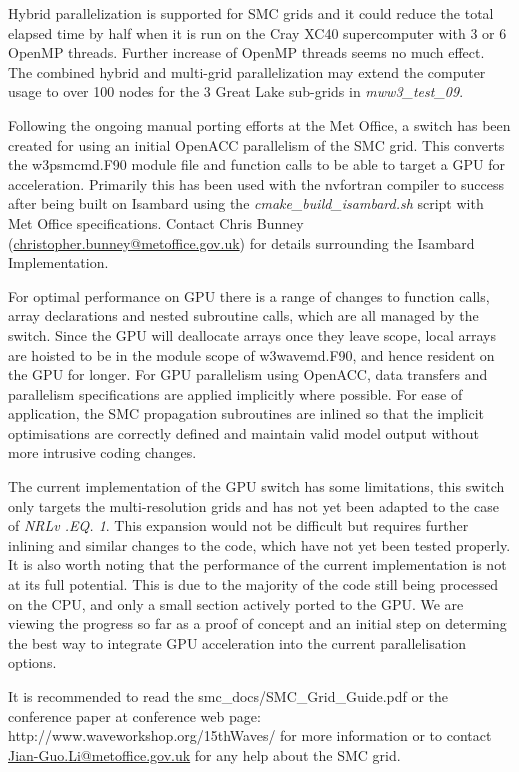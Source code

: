 Hybrid parallelization is supported for SMC grids and it could reduce the total
elapsed time by half when it is run on the Cray XC40 supercomputer with 3 or 6
OpenMP threads. Further increase of OpenMP threads seems no much effect.  The 
combined hybrid and multi-grid parallelization may extend the computer usage
to over 100 nodes for the 3 Great Lake sub-grids in \emph{mww3\_test\_09}.

Following the ongoing manual porting efforts at the Met Office, a switch has been 
created for using an initial OpenACC parallelism of the SMC grid. This converts the 
w3psmcmd.F90 module file and function calls to be able to target a GPU for 
acceleration. Primarily this has been used with the nvfortran compiler to success 
after being built on Isambard using the \emph{cmake\_build\_isambard.sh}
script with Met Office specifications. Contact Chris Bunney 
(\url{christopher.bunney@metoffice.gov.uk}) for details surrounding the Isambard 
Implementation. 

For optimal performance on GPU there is a range of changes to function calls, 
array declarations and nested subroutine calls, which are all managed by the 
switch. Since the GPU will deallocate arrays once they leave scope, local arrays 
are hoisted to be in the module scope of w3wavemd.F90, and hence resident on 
the GPU for longer. For GPU parallelism using OpenACC, data transfers and 
parallelism specifications are applied implicitly where possible. For ease of 
application, the SMC propagation subroutines are inlined so that the implicit 
optimisations are correctly defined and maintain valid model output without more 
intrusive coding changes. 

The current implementation of the GPU switch has some limitations, this switch 
only targets the multi-resolution grids and has not yet been adapted to the case 
of \emph{NRLv .EQ. 1}. This expansion would not be difficult but requires further 
inlining and similar changes to the code, which have not yet been tested properly.
It is also worth noting that the performance of the current implementation is not
at its full potential. This is due to the majority of the code still being 
processed on the CPU, and only a small section actively ported to the GPU. We are 
viewing the progress so far as a proof of concept and an initial step on determing
the best way to integrate GPU acceleration into the current parallelisation options.

It is recommended to read the smc\_docs/SMC\_Grid\_Guide.pdf or the
conference paper \citep{tol:LiS17} at conference web page: 
http://www.waveworkshop.org/15thWaves/
for more information or to contact \url{Jian-Guo.Li@metoffice.gov.uk} 
for any help about the SMC grid.

